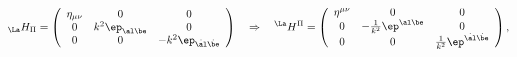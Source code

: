 \begin{equation} \label{met}
_\La H_\Pi=\left(\begin{array}{ccc} \eta_{\mu\nu} & 0 & 0 \\
0 & k^2\ep_{\al\be} & 0 \\
0 & 0 & -k^2\ep_{\dot{\al}\dot{\be}} \end{array}\right) \quad
\Rightarrow \quad ^\La H^\Pi=\left(\begin{array}{ccc} \eta^{\mu\nu} & 0 & 0 \\
0 & -\frac{1}{k^2}\ep^{\al\be} & 0 \\
0 & 0 & \frac{1}{k^2}\ep^{\dot{\al}\dot{\be}} \end{array}\right),
\end{equation}

